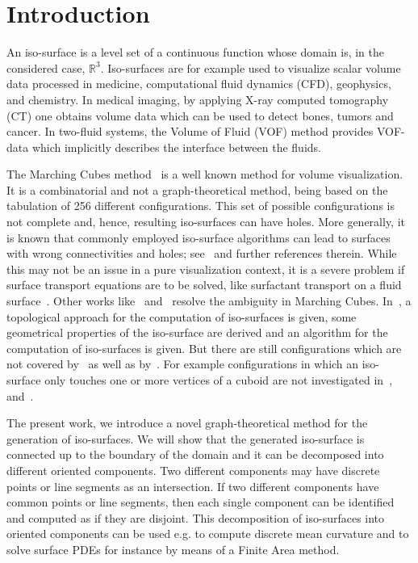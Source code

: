 \documentclass[a4paper,11pt]{article}
\begin{document}
\section{Introduction}
An iso-surface is a level set of a continuous function whose domain is, in the considered case, $\mathbb{R}^3$.
Iso-surfaces are for example used to visualize scalar volume data processed in medicine, computational
fluid dynamics (CFD), geophysics, and chemistry. In medical imaging, by applying X-ray computed tomography
(CT) one obtains volume data which can be used to detect bones, tumors and cancer. In two-fluid systems,
the Volume of Fluid (VOF) method provides VOF-data which implicitly describes the interface between the fluids.

The Marching Cubes method~\cite{Lorensen87marchingcubes:} is a well known method for volume
visualization. It is a combinatorial and not a graph-theoretical method, being based on the tabulation
of 256 different configurations. This set of possible configurations is not complete and, hence,
resulting iso-surfaces can have holes. More generally, it is known that commonly employed iso-surface
algorithms can lead to surfaces with wrong connectivities and holes; see~\cite{Etiene:2012:TVI:2197070.2197097}
and further references therein. While this may not be an issue in a pure visualization context, it is a severe
problem if surface transport equations are to be solved, like surfactant transport on a fluid
surface~\cite{Alke_and_Bothe}. Other works like~\cite{Nielson:1991:ADR:949607.949621}
and~\cite{Chernyaev95marchingcubes} resolve the
ambiguity in Marching Cubes. In~\cite{conf/dgci/Lachaud96}, a topological approach for the
computation of iso-surfaces is given, some geometrical properties of the iso-surface are derived and an
algorithm for the computation of iso-surfaces is given. But there are still configurations which are not
covered by~\cite{Nielson:1991:ADR:949607.949621} as well as by~\cite{conf/dgci/Lachaud96}. For
example configurations in which an iso-surface only touches one or more vertices of a cuboid are not investigated
in~\cite{Chernyaev95marchingcubes},~\cite{conf/dgci/Lachaud96} and~\cite{Nielson:1991:ADR:949607.949621}.

The present work, we introduce a novel graph-theoretical method for the generation of iso-surfaces. We will show
that the generated iso-surface is connected up to the boundary of the domain and it can be decomposed into
different oriented components. Two different components may have discrete points or line segments as an
intersection. If two different components have common points or line segments, then each single component
can be identified and computed as if they are disjoint. This decomposition
of iso-surfaces into oriented components can be used e.g. to compute discrete mean curvature and to solve
surface PDEs for instance by means of a Finite Area method.
\end{document}
